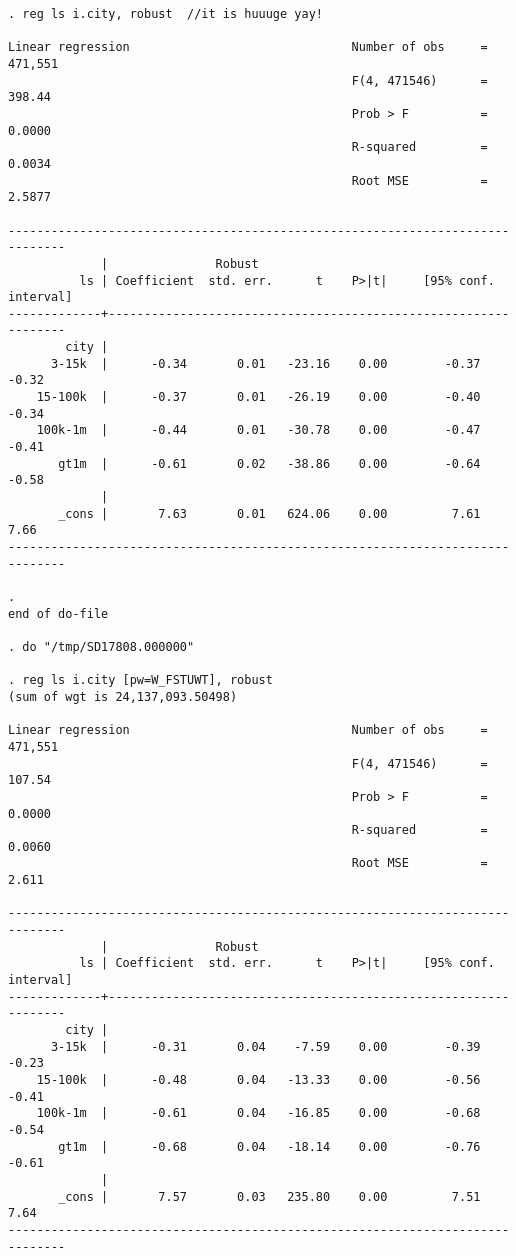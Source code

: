 \documentclass[11pt, letterpaper]{article}
\begin{document}
\begin{spacing}{1.9}
\begin{spacing}{.5}
\begin{scriptsize}
\begin{verbatim}
. reg ls i.city, robust  //it is huuuge yay!

Linear regression                               Number of obs     =    471,551
                                                F(4, 471546)      =     398.44
                                                Prob > F          =     0.0000
                                                R-squared         =     0.0034
                                                Root MSE          =     2.5877

------------------------------------------------------------------------------
             |               Robust
          ls | Coefficient  std. err.      t    P>|t|     [95% conf. interval]
-------------+----------------------------------------------------------------
        city |
      3-15k  |      -0.34       0.01   -23.16    0.00        -0.37       -0.32
    15-100k  |      -0.37       0.01   -26.19    0.00        -0.40       -0.34
    100k-1m  |      -0.44       0.01   -30.78    0.00        -0.47       -0.41
       gt1m  |      -0.61       0.02   -38.86    0.00        -0.64       -0.58
             |
       _cons |       7.63       0.01   624.06    0.00         7.61        7.66
------------------------------------------------------------------------------

. 
end of do-file

. do "/tmp/SD17808.000000"

. reg ls i.city [pw=W_FSTUWT], robust 
(sum of wgt is 24,137,093.50498)

Linear regression                               Number of obs     =    471,551
                                                F(4, 471546)      =     107.54
                                                Prob > F          =     0.0000
                                                R-squared         =     0.0060
                                                Root MSE          =      2.611

------------------------------------------------------------------------------
             |               Robust
          ls | Coefficient  std. err.      t    P>|t|     [95% conf. interval]
-------------+----------------------------------------------------------------
        city |
      3-15k  |      -0.31       0.04    -7.59    0.00        -0.39       -0.23
    15-100k  |      -0.48       0.04   -13.33    0.00        -0.56       -0.41
    100k-1m  |      -0.61       0.04   -16.85    0.00        -0.68       -0.54
       gt1m  |      -0.68       0.04   -18.14    0.00        -0.76       -0.61
             |
       _cons |       7.57       0.03   235.80    0.00         7.51        7.64
------------------------------------------------------------------------------


\end{verbatim}
\end{scriptsize}
\end{spacing}
\end{spacing}
\end{document}
